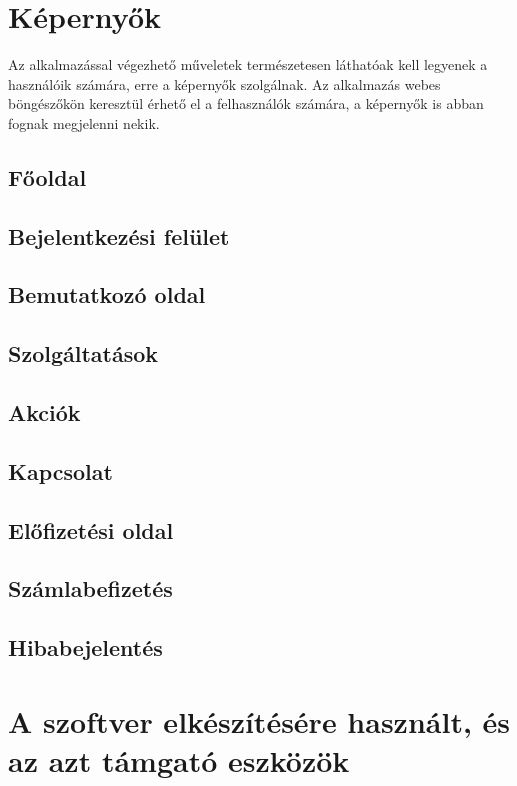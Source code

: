 \documentclass[centeredchapter]{thesis-ekf}
\theoremstyle{definition}
\theoremstyle{remark}
\begin{document}
\section{Képernyők}

Az alkalmazással végezhető műveletek természetesen láthatóak kell legyenek a használóik számára, erre a képernyők szolgálnak. Az alkalmazás webes böngészőkön keresztül érhető el a felhasználók számára, a képernyők is abban fognak megjelenni nekik.

\subsection{Főoldal}

\subsection{Bejelentkezési felület}

\subsection{Bemutatkozó oldal}

\subsection{Szolgáltatások}

\subsection{Akciók}

\subsection{Kapcsolat}

\subsection{Előfizetési oldal}

\subsection{Számlabefizetés}

\subsection{Hibabejelentés}

\section{A szoftver elkészítésére használt, és az azt támgató eszközök}
\end{document}
